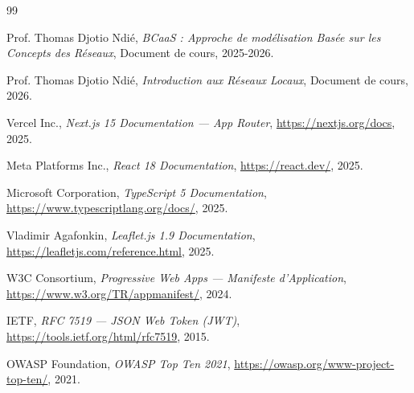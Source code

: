 \documentclass[12pt,a4paper]{report}
\begin{document}
\begin{thebibliography}{99}

Prof. Thomas Djotio Ndié, \textit{BCaaS : Approche de modélisation Basée sur les Concepts des Réseaux}, Document de cours, 2025-2026.

Prof. Thomas Djotio Ndié, \textit{Introduction aux Réseaux Locaux}, Document de cours, 2026.

Vercel Inc., \textit{Next.js 15 Documentation — App Router}, \url{https://nextjs.org/docs}, 2025.

Meta Platforms Inc., \textit{React 18 Documentation}, \url{https://react.dev/}, 2025.

Microsoft Corporation, \textit{TypeScript 5 Documentation}, \url{https://www.typescriptlang.org/docs/}, 2025.

Vladimir Agafonkin, \textit{Leaflet.js 1.9 Documentation}, \url{https://leafletjs.com/reference.html}, 2025.

W3C Consortium, \textit{Progressive Web Apps — Manifeste d'Application}, \url{https://www.w3.org/TR/appmanifest/}, 2024.

IETF, \textit{RFC 7519 — JSON Web Token (JWT)}, \url{https://tools.ietf.org/html/rfc7519}, 2015.

OWASP Foundation, \textit{OWASP Top Ten 2021}, \url{https://owasp.org/www-project-top-ten/}, 2021.

\end{thebibliography}
\end{document}
